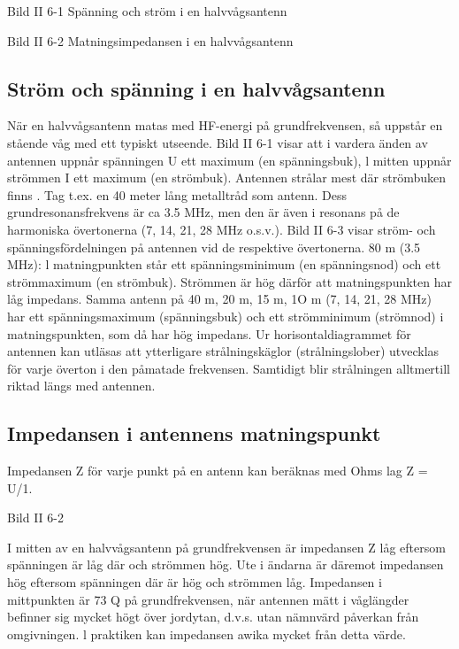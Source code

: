 Bild II 6-1 Spänning och ström i en halvvågsantenn

Bild II 6-2 Matningsimpedansen i en halvvågsantenn

\subsection{Ström och spänning i en halvvågsantenn}


När en halvvågsantenn matas med HF-energi på grundfrekvensen, så uppstår en stående våg med ett typiskt utseende.
Bild II 6-1 visar att i vardera änden av
antennen uppnår spänningen U ett maximum (en spänningsbuk), l mitten uppnår
strömmen I ett maximum (en strömbuk).
Antennen strålar mest där strömbuken finns .
Tag t.ex. en 40 meter lång metalltråd
som antenn. Dess grundresonansfrekvens
är ca 3.5 MHz, men den är även i resonans
på de harmoniska övertonerna (7, 14, 21,
28 MHz o.s.v.).
Bild II 6-3 visar ström- och spänningsfördelningen på antennen vid de respektive
övertonerna.
80 m (3.5 MHz):
l matningpunkten står ett spänningsminimum (en spänningsnod) och ett strömmaximum (en strömbuk). Strömmen är hög
därför att matningspunkten har låg impedans.
Samma antenn på 40 m, 20 m, 15 m, 1O
m (7, 14, 21, 28 MHz) har ett spänningsmaximum (spänningsbuk) och ett strömminimum (strömnod) i matningspunkten, som
då har hög impedans.
Ur horisontaldiagrammet för antennen
kan utläsas att ytterligare strålningskäglor
(strålningslober) utvecklas för varje överton
i den påmatade frekvensen. Samtidigt blir
strålningen alltmertill riktad längs med antennen.

\subsection{Impedansen i antennens matningspunkt}

Impedansen Z för varje punkt på en antenn
kan beräknas med Ohms lag Z = U/1.

Bild II 6-2

I mitten av en halvvågsantenn på grundfrekvensen är impedansen Z låg eftersom
spänningen är låg där och strömmen hög.
Ute i ändarna är däremot impedansen hög
eftersom spänningen där är hög och strömmen låg.
Impedansen i mittpunkten är 73 Q på
grundfrekvensen, när antennen mätt i våglängder befinner sig mycket högt över jordytan, d.v.s. utan nämnvärd påverkan från
omgivningen. l praktiken kan impedansen
awika mycket från detta värde.

